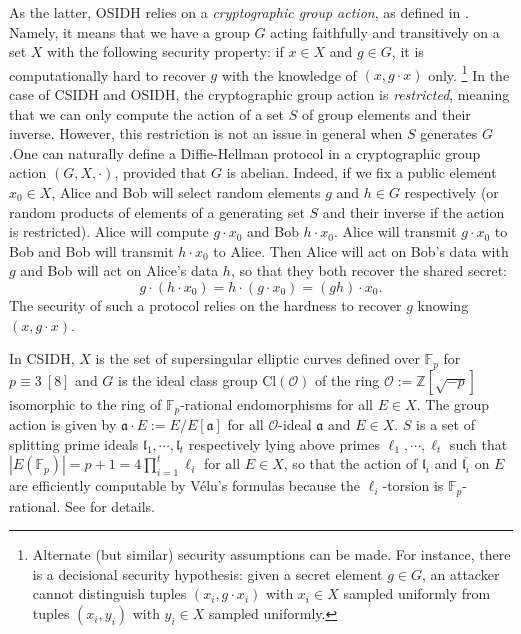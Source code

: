 \documentclass[a4paper,10pt]{report}
\theoremstyle{definition}
\theoremstyle{plain}
\theoremstyle{definition}
\newcommand{\Z}{\mathbb{Z}}
\newcommand{\F}{\mathbb{F}}
\newcommand{\mO}{\mathcal{O}}
\renewcommand{\(}{\left(}
\renewcommand{\)}{\right)}
\newcommand{\mf}[1]{\mathfrak{#1}}
\begin{document}
As the latter, OSIDH relies on a \emph{cryptographic group action}, as defined in \cite{DeFeo1}. Namely, it means that we have a group $G$ acting faithfully and transitively on a set $X$ with the following security property: if $x\in X$ and $g\in G$, it is computationally hard to recover $g$ with the knowledge of $(x,g\cdot x)$ only. \footnote{Alternate (but similar) security assumptions can be made. For instance, there is a decisional security hypothesis: given a secret element $g\in G$, an attacker cannot distinguish tuples $(x_i, g\cdot x_i)$ with $x_i\in X$ sampled uniformly from tuples $(x_i,y_i)$ with $y_i\in X$ sampled uniformly.} In the case of CSIDH and OSIDH, the cryptographic group action is \emph{restricted}, meaning that we can only compute the action of a set $S$ of group elements and their inverse. However, this restriction is not an issue in general when $S$ generates $G$.One can naturally define a Diffie-Hellman protocol in a cryptographic group action $(G,X,\cdot)$, provided that $G$ is abelian. Indeed, if we fix a public element $x_0\in X$, Alice and Bob will select random elements $g$ and $h\in G$ respectively (or random products of elements of a generating set $S$ and their inverse if the action is restricted). Alice will compute $g\cdot x_0$ and Bob $h\cdot x_0$. Alice will transmit $g\cdot x_0$ to Bob and Bob will transmit $h\cdot x_0$ to Alice. Then Alice will act on Bob's data with $g$ and Bob will act on Alice's data $h$, so that they both recover the shared secret:
\[g\cdot(h\cdot x_0)=h\cdot(g\cdot x_0)=(gh)\cdot x_0.\]
The security of such a protocol relies on the hardness to recover $g$ knowing $(x,g\cdot x)$.

In CSIDH,  $X$ is the set of supersingular elliptic curves defined over $\F_p$ for $p\equiv 3 \ [8]$ and $G$ is the ideal class group $\mbox{Cl}(\mO)$ of the ring $\mO:=\Z[\sqrt{-p}]$ isomorphic to the ring of $\F_p$-rational endomorphisms for all $E\in X$. The group action is given by $\mf{a}\cdot E:=E/E[\mf{a}]$ for all $\mO$-ideal $\mf{a}$ and $E\in X$. $S$ is a set of splitting prime ideals $\mf{l}_1, \cdots, \mf{l}_t$ respectively lying above primes $\ell_1, \cdots, \ell_t$ such that $|E(\F_p)|=p+1=4\prod_{i=1}^t\ell_i$ for all $E\in X$, so that the action of $\mf{l}_i$ and $\overline{\mf{l}_i}$ on $E$ are efficiently computable by V\'{e}lu's formulas \cite{Velu} because the $\ell_i$-torsion is $\F_p$-rational.  See \cite{CSIDH} for details.  
\end{document}

